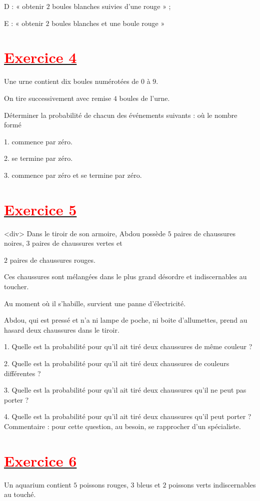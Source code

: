 \documentclass[12pt]{article}
\begin{document}
D : « obtenir $2$ boules blanches suivies d'une rouge » ;

E : « obtenir $2$ boules blanches et une boule rouge »
\section*{\underline{\textbf{\textcolor{red}{Exercice 4}}}}
Une urne contient dix boules numérotées de $0$ à $9.$

On tire successivement avec remise $4$ boules de l'urne.

	
Déterminer la probabilité de chacun des événements suivants : où le nombre formé

1. commence par zéro.

2. se termine par zéro.
	
3. commence par zéro et se termine par zéro.
\section*{\underline{\textbf{\textcolor{red}{Exercice 5}}}}
<div>
	Dans le tiroir de son armoire, Abdou possède $5$ paires de chaussures noires, $3$ paires de chaussures vertes et

$2$ paires de chaussures rouges. 

Ces chaussures sont mélangées dans le plus grand désordre et indiscernables au toucher.

Au moment où il s'habille, survient une panne d'électricité.

Abdou, qui est pressé et n'a ni lampe de poche, ni boite d'allumettes, prend au hasard deux chaussures dans le tiroir.

1. Quelle est la probabilité pour qu'il ait tiré deux chaussures de même couleur ?

2. Quelle est la probabilité pour qu'il ait tiré deux chaussures de couleurs différentes ?

3. Quelle est la probabilité pour qu'il ait tiré deux chaussures qu'il ne peut pas porter ?

4. Quelle est la probabilité pour qu'il ait tiré deux chaussures qu'il peut porter ? Commentaire : pour cette question, au besoin, se rapprocher d'un spécialiste.
\section*{\underline{\textbf{\textcolor{red}{Exercice 6}}}}

Un aquarium contient $5$ poissons rouges, $3$ bleus et $2$ poissons verts indiscernables au touché.
\end{document}
